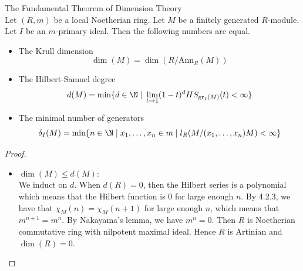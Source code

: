 \documentclass[a4paper]{article}
\begin{document}
\begin{thm}{The Fundamental Theorem of Dimension Theory}{}\\
Let $(R,m)$ be a local Noetherian ring. Let $M$ be a finitely generated $R$-module. Let $I$ be an $m$-primary ideal. Then the following numbers are equal. 
\begin{itemize}
\item The Krull dimension $$\dim(M)=\dim(R/\text{Ann}_R(M))$$
\item The Hilbert-Samuel degree $$d(M)=\min\{d\in\N\;|\;\lim_{t\to 1}(1-t)^dHS_{\text{gr}_I(M)}(t)<\infty\}$$
\item The minimal number of generators $$\delta_I(M)=\min\{n\in\N\;|\;x_1,\dots,x_n\in m\;|\;l_R(M/(x_1,\dots,x_n)M)<\infty\}$$
\end{itemize} 
\begin{proof}
\begin{itemize}
\item $\dim(M)\leq d(M)$: \\
We induct on $d$. When $d(R)=0$, then the Hilbert series is a polynomial which means that the Hilbert function is $0$ for large enough $n$. By 4.2.3, we have that $\chi_M(n)=\chi_M(n+1)$ for large enough $n$, which means that $m^{n+1}=m^n$. By Nakayama's lemma, we have $m^n=0$. Then $R$ is Noetherian commutative ring with nilpotent maximal ideal. Hence $R$ is Artinian and $\dim(R)=0$. \\


\end{itemize}
\end{proof}
\end{thm}
\end{document}
